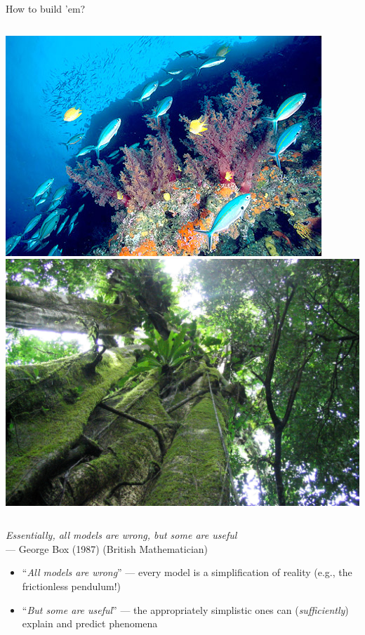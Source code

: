 \documentclass[xcolor={usenames,x11names},compress]{beamer}
\renewcommand{\(}{\begin{columns}}
\renewcommand{\)}{\end{columns}}
\newcommand{\<}[1]{\begin{column}{#1}}
\renewcommand{\>}{\end{column}}
\begin{document}
\begin{frame}{How to build 'em?}

\begin{columns}[c]
  \column{2.3in}
    \includegraphics[width=\textwidth]{Reef.jpg}
  \column{2.3in}
    \includegraphics[width=\textwidth]{Forest.jpg}
  \end{columns}

  \begin{center}
    {\it Essentially, all models are wrong, but some are useful}\\--- 
    {\small George Box (1987) (British Mathematician)}
  \end{center}

  \pause
  \begin{itemize}[<+->] \itemsep6pt
    \item ``{\it All models are wrong}'' --- every model is a 
      simplification of reality (e.g., the frictionless pendulum!)

    \item ``{\it But some are useful}'' --- the appropriately simplistic 
      ones can ({\it sufficiently}) explain and predict phenomena
  \end{itemize}

\end{frame}
\end{document}
